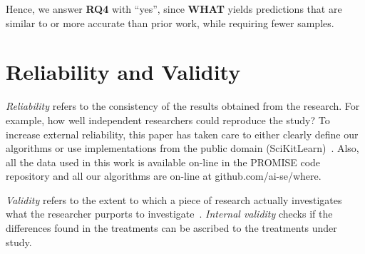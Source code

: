 \documentclass{newsig}
\newcommand{\bi}{\begin{itemize}}%
\newcommand{\ei}{\end{itemize}}
\newcommand{\fig}[1]{Figure~\ref{fig:#1}}
\newcommand{\what}{{\bf WHAT }}
\begin{document}




\begin{myshadowbox}
Hence, we answer {\bf RQ4} with ``yes'',
since \what yields predictions that are similar to or more accurate than prior
work, while requiring fewer samples.
\end{myshadowbox}

\newpage

\section{Reliability and Validity}\label{sect:construct}

{\em Reliability} refers to the consistency of the results obtained
from the research.  For example,   how well independent researchers
could reproduce the study? To increase external
reliability, this paper has taken care to either  clearly define our
algorithms or use implementations from the public domain
(SciKitLearn)~\cite{scikit-learn}. Also, all the data used in this work is available
on-line in the PROMISE code repository and all our algorithms
are on-line at github.com/ai-se/where.

{\em Validity} refers to the extent to which a piece of research actually
investigates what the researcher purports to investigate~\cite{SSA15}.
{\em Internal validity} checks if the differences found in
the treatments can be ascribed to the treatments under study. 
\end{document}
